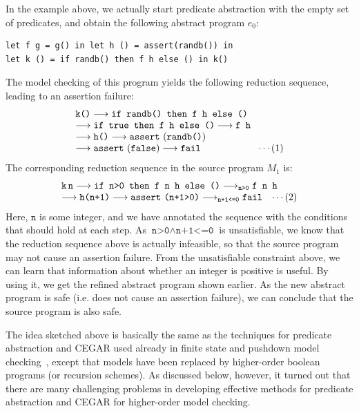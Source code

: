 In the example above, we actually start predicate abstraction with the 
empty set of predicates, and obtain the following abstract program 
\(e_0\):
\begin{verbatim}
let f g = g() in let h () = assert(randb()) in
let k () = if randb() then f h else () in k()
\end{verbatim}
The model checking of this program yields the following reduction 
sequence, leading to an assertion failure:
\[
\begin{array}{l}
\texttt{k()}
\longrightarrow 
\texttt{if randb() then f h else ()}\\
\longrightarrow 
\texttt{if true then f h else ()}
\longrightarrow \texttt{f h}\\
\longrightarrow \texttt{h()} \longrightarrow \mathtt{assert~}(\texttt{randb()})\\
\longrightarrow
\mathtt{assert~}(\texttt{false}) \longrightarrow \mathtt{fail}
\qquad \qquad \qquad {\cdots(1)}
\end{array}
\]
The corresponding reduction sequence in the source program \(M_1\) is:
\[
\begin{array}{l}
\texttt{k}\, \texttt{n} \longrightarrow \texttt{if n>0 then f n h else ()}\longrightarrow_{\texttt{n>0}} \texttt{f n h} \\
\longrightarrow \texttt{h(n+1)} \longrightarrow \mathtt{assert~}{\texttt{(n+1>0)}} \longrightarrow_{\texttt{n+1<=0}} \mathtt{fail}
\quad {\cdots(2)}
\end{array}
\]
Here, \(\texttt{n}\) is some integer, and we have annotated the sequence 
with the conditions that should hold at each step. As \(\texttt{n>0} 
\land \texttt{n+1<=0}\) is unsatisfiable, we know that the reduction 
sequence above is actually infeasible, so that the source program may 
not cause an assertion failure. From the unsatisfiable constraint above, 
we can learn that information about whether an integer is positive is 
useful. By using it, we get the refined abstract program shown earlier. 
As the new abstract program is safe (i.e. does not cause an assertion 
failure), we can conclude that the source program is also safe.

The idea sketched above is basically the same as the techniques for 
predicate abstraction and CEGAR used already in finite state and 
pushdown model checking~\cite{Clarke2003a,Ball2002}, except that models 
have been replaced by higher-order boolean programs (or recursion 
schemes). 
As discussed below, however, it turned out that there are many 
challenging problems in developing effective methods for predicate 
abstraction and CEGAR for higher-order model checking.

